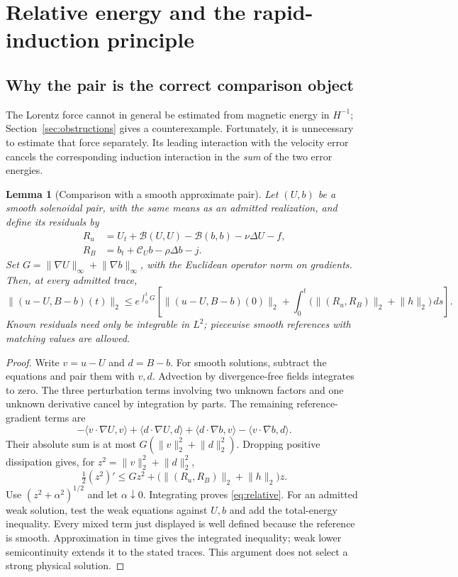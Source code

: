 \documentclass[11pt,a4paper]{amsart}
\newtheorem{lemma}[theorem]{Lemma}
\theoremstyle{definition}
\theoremstyle{remark}
\numberwithin{equation}{section}
\newcommand{\Bcal}{\mathcal B}
\newcommand{\Ccal}{\mathcal C}
\newcommand{\ip}[2]{\langle #1,#2\rangle}
\newcommand{\norm}[1]{\lVert #1\rVert}
\begin{document}
\section{Relative energy and the rapid-induction principle}\label{sec:energy}

\subsection{Why the pair is the correct comparison object}
The Lorentz force cannot in general be estimated from magnetic energy in $H^{-1}$; Section~\ref{sec:obstructions} gives a counterexample. Fortunately, it is unnecessary to estimate that force separately. Its leading interaction with the velocity error cancels the corresponding induction interaction in the \emph{sum} of the two error energies.

\begin{lemma}[Comparison with a smooth approximate pair]\label{lem:relative}
Let $(U,b)$ be a smooth solenoidal pair, with the same means as an admitted realization, and define its residuals by
\begin{align*}
 R_u&=U_t+\Bcal(U,U)-\Bcal(b,b)-\nu\Delta U-f,\\
 R_B&=b_t+\Ccal_Ub-\rho\Delta b-j.
\end{align*}
Set $G=\norm{\nabla U}_\infty+\norm{\nabla b}_\infty$, with the Euclidean operator norm on gradients. Then, at every admitted trace,
\begin{equation}\label{eq:relative}
 \norm{(u-U,B-b)(t)}_2
 \le e^{\int_0^tG}
 \left[\norm{(u-U,B-b)(0)}_2+
 \int_0^t\big(\norm{(R_u,R_B)}_2+\norm h_2\big)\,ds\right].
\end{equation}
Known residuals need only be integrable in $L^2$; piecewise smooth references with matching values are allowed.
\end{lemma}

\begin{proof}
Write $v=u-U$ and $d=B-b$. For smooth solutions, subtract the equations and pair them with $v,d$. Advection by divergence-free fields integrates to zero. The three perturbation terms involving two unknown factors and one unknown derivative cancel by integration by parts. The remaining reference-gradient terms are
\[
 -\ip{v\cdot\nabla U}{v}+\ip{d\cdot\nabla U}{d}
 +\ip{d\cdot\nabla b}{v}-\ip{v\cdot\nabla b}{d}.
\]
Their absolute sum is at most $G(\norm v_2^2+\norm d_2^2)$. Dropping positive dissipation gives, for $z^2=\norm v_2^2+\norm d_2^2$,
\[
 \tfrac12(z^2)'\le Gz^2+
 \big(\norm{(R_u,R_B)}_2+\norm h_2\big)z.
\]
Use $(z^2+\alpha^2)^{1/2}$ and let $\alpha\downarrow0$. Integrating proves \eqref{eq:relative}. For an admitted weak solution, test the weak equations against $U,b$ and add the total-energy inequality. Every mixed term just displayed is well defined because the reference is smooth. Approximation in time gives the integrated inequality; weak lower semicontinuity extends it to the stated traces. This argument does not select a strong physical solution.
\end{proof}
\end{document}
